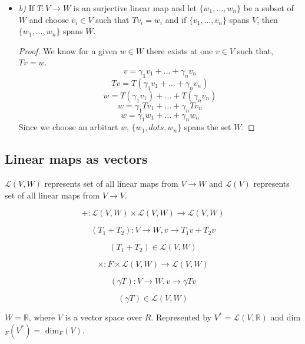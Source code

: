 \documentclass[11pt,a4paper]{colorart}
\def\l{\left}
\def\r{\right}
\def\R{\mathbb{R}}
\def\g{\gamma}
\def\L{\mathcal{L}}
\begin{document}
\begin{enumerate}
\begin{itemize}
\begin{proof}
					Injectivity of the linear map implies,
					\[ \g_1v_2 + \dots + \g_nv_n = 0\]
					Linear independence of $\{v_1,\dots,v_n\}$
					\[ \g_1 = \dots = \g_n = 0 \]
				\end{proof}
			\item \textit{b)} If $T:V\rightarrow W$ is an surjective linear map and let $\{w_1,\dots,w_n\}$ be a subset of $W$ and choose $v_i\in V$ such that $Tv_i = w_i$ and if $\{v_1,\dots,v_n\}$ spans $V$, then $\{w_1,\dots,w_n\}$ spans $W$.
				\begin{proof}
					We know for a given $w\in W$ there exists at one $v\in V$ such that, $Tv=w$.
					\[ v = \g_1v_1+\dots+\g_nv_n\]
					\[ Tv = T\l(\g_1v_1+\dots+\g_nv_n\r)\]
					\[ w = T\l(\g_1v_1\r)+\dots+T\l(\g_nv_n\r)\]
					\[ w = \g_1 Tv_1 + \dots + \g_n Tv_n \]
					\[ w = \g_1 w_1 +\dots+ \g_n w_n \]
					Since we choose an arbitart $w$, $\{w_1,dots,w_n\}$ spans the set $W$.
				\end{proof}
		\end{itemize}
\end{enumerate}

\subsection{Linear maps as vectors}

\begin{convention}
	$\L\l(V,W\r)$ represents set of all linear maps from $V\rightarrow W$ and $\L\l(V\r)$ represents set of all linear maps from $V\rightarrow V$.
\end{convention}

\[ +:\L\l(V,W\r) \times \L\l(V,W\r) \rightarrow \L\l(V,W\r) \]

\[ \l(T_1+T_2\r): V \rightarrow W, v \rightarrow T_1v+T_2v \]

\[ \l(T_1+T_2\r) \in \L\l(V,W\r) \]

\[ \times :F \times \L\l(V,W\r) \rightarrow \L\l(V,W\r) \]

\[ \l(\g T\r): V \rightarrow W, v \rightarrow \g Tv \]

\[ \l(\g T\r) \in \L\l(V,W\r) \]

\begin{example}[Dual of $V$]
	$W = \R$, where $V$ is a vector space over $R$. Represented by $V^*=\L\l(V,\R\r)$ and dim$_F\l(V^*\r)=$ dim$_F\l(V\r)$.
\end{example}
\end{document}
